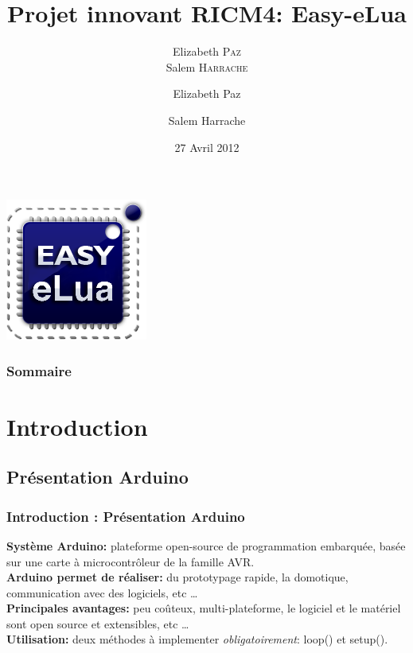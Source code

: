 \documentclass{beamer}
\title{Projet innovant RICM4: Easy-eLua}
\author{Elizabeth \textsc{Paz} \\ Salem \textsc{Harrache}}
\institute{Polytech'Grenoble \\
Olivier \textsc{Richard} \\
Didier \textsc{Donsez} \\
}
\author[Elizabeth Paz, Salem Harrache]
{Elizabeth Paz \and Salem Harrache}
\date{27 Avril 2012}
\begin{document}
\begin{frame}
\begin{center}
\includegraphics[scale=0.4]{../images/easy_elua_logo}
\end{center}
\titlepage
\end{frame}

\begin{frame}
\frametitle{Sommaire}
\tableofcontents
\end{frame}

\section{Introduction}

\subsection{Présentation Arduino}
\begin{frame}
\frametitle{Introduction : Présentation Arduino}
\textbf{Système Arduino: } plateforme open-source de programmation embarquée, basée sur une carte
à microcontrôleur de la famille AVR. \\
\vspace{0.5cm}
\textbf{Arduino permet de réaliser: } du prototypage rapide, la domotique, communication avec des logiciels, etc \ldots \\
\vspace{0.5cm}
\textbf{Principales avantages: } peu coûteux, multi-plateforme, le logiciel et le matériel sont open source et extensibles, etc \ldots \\
\vspace{0.5cm}
\textbf{Utilisation: } deux méthodes à implementer \textit{obligatoirement}: loop() et setup().

\end{frame}
\end{document}
